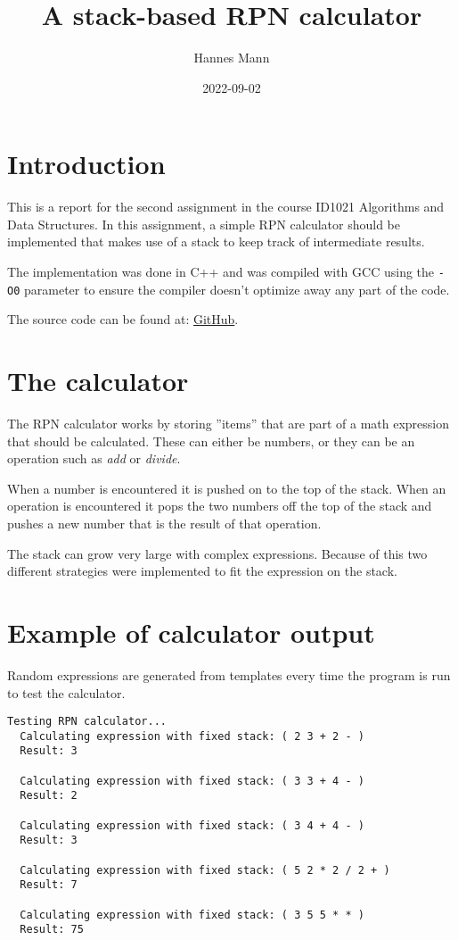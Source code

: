 \documentclass[a4paper,11pt]{article}
\begin{document}
\title{
    \textbf{A stack-based RPN calculator}
}
\author{Hannes Mann}
\date{2022-09-02}

\maketitle

\section*{Introduction}

This is a report for the second assignment in the course ID1021 Algorithms and Data Structures. In this assignment, a simple RPN calculator should be implemented that makes use of a stack to keep track of intermediate results.

The implementation was done in C++ and was compiled with GCC using the {\tt -O0} parameter to ensure the compiler doesn't optimize away any part of the code.

The source code can be found at: \href{https://github.com/HannesMann/ID1021/tree/main/src/calc}{GitHub}.

\section*{The calculator}

The RPN calculator works by storing ''items'' that are part of a math expression that should be calculated. These can either be numbers, or they can be an operation such as \emph{add} or \emph{divide}.

When a number is encountered it is pushed on to the top of the stack. When an operation is encountered it pops the two numbers off the top of the stack and pushes a new number that is the result of that operation.

The stack can grow very large with complex expressions. Because of this two different strategies were implemented to fit the expression on the stack.

\section*{Example of calculator output}

Random expressions are generated from templates every time the program is run to test the calculator.

\begin{verbatim}
Testing RPN calculator...
  Calculating expression with fixed stack: ( 2 3 + 2 - )
  Result: 3

  Calculating expression with fixed stack: ( 3 3 + 4 - )
  Result: 2

  Calculating expression with fixed stack: ( 3 4 + 4 - )
  Result: 3

  Calculating expression with fixed stack: ( 5 2 * 2 / 2 + )
  Result: 7

  Calculating expression with fixed stack: ( 3 5 5 * * )
  Result: 75
\end{verbatim}
\end{document}
